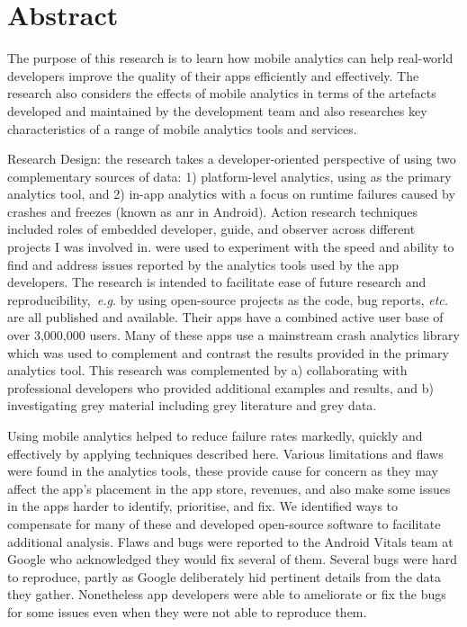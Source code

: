 \chapter*{Abstract}

The purpose of this research is to learn how mobile analytics can help
real-world developers improve the quality of their apps efficiently and effectively. The research also considers the effects of mobile analytics in terms of the artefacts developed and maintained by the development team and also researches key characteristics of a range of mobile analytics tools and services. %

Research Design: the research takes a developer-oriented perspective of using two complementary sources of data: 1) platform-level analytics, using  as the primary analytics tool, and 2) in-app analytics with a focus on runtime failures caused by crashes and freezes (known as \Gls{anr} in Android).
%
Action research techniques included roles of embedded developer, guide, and observer across different projects I was involved in.  were used to experiment with the speed and ability to find and address issues reported by the analytics tools used by the app developers. 
%
The research is intended to facilitate ease of future research and reproducibility,~\emph{e.g.} by using  open-source projects as the code, bug reports, \emph{etc.} are all published and available. Their apps have a combined active user base of over 3,000,000 users. Many of these apps use a mainstream crash analytics library which was used to complement and contrast the results provided in the primary analytics tool.
%
This research was complemented by a) collaborating with professional developers who provided additional examples and results, and b) investigating grey material including grey literature and grey data.

Using mobile analytics helped to reduce failure rates markedly, quickly and effectively by applying techniques described here.
Various limitations and flaws were found in the analytics tools, these provide cause for concern as they may affect the app's placement in the app store, revenues, and also make some issues in the apps harder to identify, prioritise, and fix. We identified ways to compensate for many of these and developed open-source software to facilitate additional analysis. Flaws and bugs were reported to the Android Vitals team at Google who acknowledged they would fix several of them.
%
Several bugs were hard to reproduce, partly as Google deliberately hid pertinent details from the data they gather. Nonetheless app developers were able to ameliorate or fix the bugs for some issues even when they were not able to reproduce them. 


